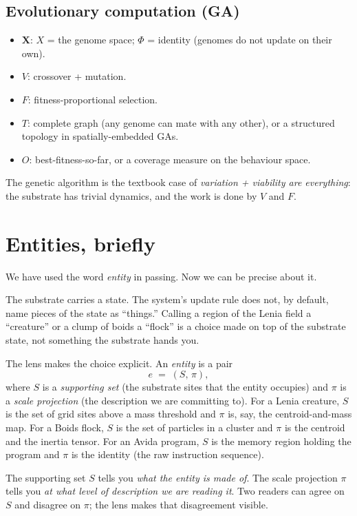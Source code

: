\subsection*{Evolutionary computation (GA)}

\begin{itemize}[leftmargin=1.5em,itemsep=2pt]
  \item $\mathbf{X}$: $X$ = the genome space; $\Phi$ = identity (genomes
    do not update on their own).
  \item $V$: crossover + mutation.
  \item $F$: fitness-proportional selection.
  \item $T$: complete graph (any genome can mate with any other), or a
    structured topology in spatially-embedded GAs.
  \item $O$: best-fitness-so-far, or a coverage measure on the
    behaviour space.
\end{itemize}

The genetic algorithm is the textbook case of \emph{variation +
viability are everything}: the substrate has trivial dynamics, and the
work is done by $V$ and $F$.

\section{Entities, briefly}

We have used the word \emph{entity} in passing. Now we can be precise
about it.

The substrate carries a state. The system's update rule does not, by
default, name pieces of the state as ``things.'' Calling a region of the
Lenia field a ``creature'' or a clump of boids a ``flock'' is a choice
made on top of the substrate state, not something the substrate hands
you.

The lens makes the choice explicit. An \emph{entity} is a pair
\[
  e \;=\; (S,\, \pi),
\]
where $S$ is a \emph{supporting set} (the substrate sites that the
entity occupies) and $\pi$ is a \emph{scale projection} (the description
we are committing to). For a Lenia creature, $S$ is the set of grid
sites above a mass threshold and $\pi$ is, say, the centroid-and-mass
map. For a Boids flock, $S$ is the set of particles in a cluster and
$\pi$ is the centroid and the inertia tensor. For an Avida program, $S$
is the memory region holding the program and $\pi$ is the identity
(the raw instruction sequence).

The supporting set $S$ tells you \emph{what the entity is made of}. The
scale projection $\pi$ tells you \emph{at what level of description we
are reading it}. Two readers can agree on $S$ and disagree on $\pi$; the
lens makes that disagreement visible.

